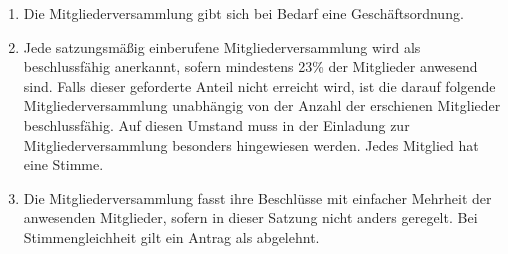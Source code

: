 \documentclass[a4paper,11pt]{scrartcl}
\begin{document}
\begin{enumerate}
\begin{itemize}
    \end{itemize}
  \item Die Mitgliederversammlung gibt sich bei Bedarf eine Geschäftsordnung.
  \item Jede satzungsmäßig einberufene Mitgliederversammlung wird als 
    beschlussfähig anerkannt, sofern mindestens 23\% der Mitglieder anwesend sind. 
    Falls dieser geforderte Anteil nicht erreicht wird, ist die darauf folgende 
    Mitgliederversammlung unabhängig von der Anzahl der erschienen Mitglieder 
    beschlussfähig. Auf diesen Umstand muss in der Einladung zur 
    Mitgliederversammlung besonders hingewiesen werden. Jedes Mitglied hat eine 
    Stimme.
  \item Die Mitgliederversammlung fasst ihre Beschlüsse mit einfacher Mehrheit 
    der anwesenden Mitglieder, sofern in dieser Satzung nicht anders geregelt. Bei 
    Stimmengleichheit gilt ein Antrag als abgelehnt.
\end{enumerate}
\end{document}
